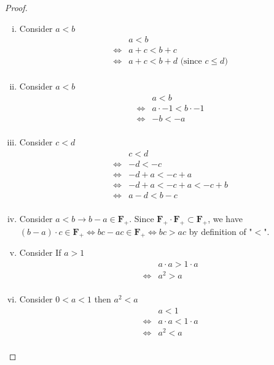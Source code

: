 \documentclass[10pt,letterpaper]{article}
\begin{document}
\begin{proof}
	\text{ }
	\begin{enumerate}[(i)]
		\item Consider $a < b$
		\begin{eqnarray*}
		& & a < b \\
		& \Leftrightarrow & a + c < b + c \\
		& \Leftrightarrow & a + c < b + d \text{ (since } c \leq d ) \\
		\end{eqnarray*} 
		
		\item Consider $a < b$
		\begin{eqnarray*}
		& & a < b \\
		& \Leftrightarrow & a \cdot -1 < b \cdot -1\\
		& \Leftrightarrow & -b < -a \\
		\end{eqnarray*}
		
		\item Consider $c < d$
		\begin{eqnarray*}
		& & c < d \\
		& \Leftrightarrow & -d < -c\\
		& \Leftrightarrow & -d + a < -c + a \\
		& \Leftrightarrow & -d + a < -c + a < -c + b \\
		& \Leftrightarrow & a - d < b - c \\
		\end{eqnarray*}
		
		\item Consider $a < b \rightarrow b - a \in \mathbf{F_{+}}$.
		Since $\mathbf{F_{+}} \cdot \mathbf{F_{+}} \subset \mathbf{F_{+}}$, we have
		$(b - a) \cdot c \in \mathbf{F_{+}} \Leftrightarrow bc - ac \in \mathbf{F_{+}}
		\Leftrightarrow bc > ac$ by definition of "$<$".
		
		\item Consider If $a > 1$ 
		\begin{eqnarray*}
		& & a \cdot a > 1 \cdot a \\
		& \Leftrightarrow & a^2 > a \\
		\end{eqnarray*}
		
		\item Consider $0 < a < 1$ then $a^2 < a$
		\begin{eqnarray*}
		& & a < 1 \\
		& \Leftrightarrow & a \cdot a < 1 \cdot a \\
		& \Leftrightarrow & a^2 < a \\
		\end{eqnarray*}
		

\end{enumerate}
\end{proof}
\end{document}
